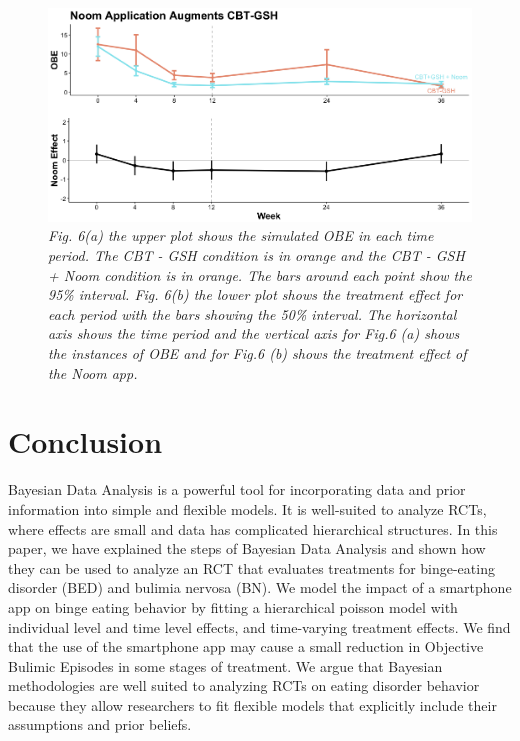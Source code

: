 \documentclass{article}
\begin{document}
\begin{figure}[H]
\begin{center}
\includegraphics[width=\textwidth, height=\textheight, keepaspectratio]{noom_effect.png}
\caption{\emph{Fig. 6(a) the upper plot shows the simulated OBE in each time period. The CBT - GSH condition is in orange and the CBT - GSH + Noom condition is in orange. The bars around each point show the 95\% interval. Fig. 6(b) the lower plot shows the treatment effect for each period with the bars showing the 50\% interval. The horizontal axis shows the time period and the vertical axis for Fig.6 (a) shows the instances of OBE and for Fig.6 (b) shows the treatment effect of the Noom app.}}
\end{center}
\end{figure}

\section{Conclusion}
Bayesian Data Analysis is a powerful tool for incorporating data and prior information into simple and flexible models.  It is well-suited to analyze RCTs, where effects are small and data has complicated hierarchical structures.  In this paper, we have explained the steps of Bayesian Data Analysis and shown how they can be used to analyze an RCT that evaluates treatments for binge-eating disorder (BED) and bulimia nervosa (BN).  We model the impact of a smartphone app on binge eating behavior by fitting a hierarchical poisson model with individual level and time level effects, and time-varying treatment effects.  We find that the use of the smartphone app may cause a small reduction in Objective Bulimic Episodes in some stages of treatment.  We argue that Bayesian methodologies are well suited to analyzing RCTs on eating disorder behavior because they allow researchers to fit flexible models that explicitly include their assumptions and prior beliefs.
\end{document}
